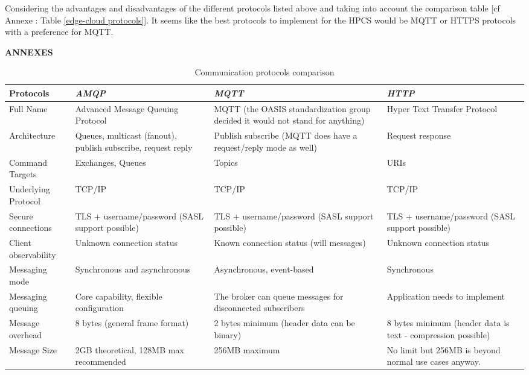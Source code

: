 Considering the advantages and disadvantages of the different protocols listed above and taking into account the comparison table [cf Annexe : Table \ref{edge-cloud protocols}].
It seems like the best protocols to implement for the HPCS would be MQTT or HTTPS protocols with a preference for MQTT.

\newpage
\onecolumn
\centering\textbf{ANNEXES}

\begin{table}[htbp]
    \caption{Communication protocols comparison}
    \begin{center}
    \renewcommand{\arraystretch}{2}
    \begin{tabular}{|p{3cm}|p{4.5cm}|p{4.5cm}|p{4.5cm}|}
    \hline
    \textbf{{Protocols}}& \textbf{\textit{AMQP}}& \textbf{\textit{MQTT}}& \textbf{\textit{HTTP}} \\
    \hline
    Full Name & Advanced Message Queuing Protocol & MQTT (the OASIS standardization group decided it would not stand for anything) & Hyper Text Transfer Protocol\\
    \hline
    Architecture & Queues, multicast (fanout), publish subscribe, request reply & Publish subscribe (MQTT does have a request/reply mode as well) & Request response\\
    \hline
    Command Targets & Exchanges, Queues & Topics & URIs\\
    \hline
    Underlying Protocol & TCP/IP & TCP/IP & TCP/IP\\
    \hline
    Secure connections & TLS + username/password (SASL support possible) & TLS + username/password (SASL support possible) & TLS + username/password (SASL support possible)\\
    \hline
    Client observability & Unknown connection status & Known connection status (will messages) & Unknown connection status\\
    \hline
    Messaging mode & Synchronous and asynchronous & Asynchronous, event-based & Synchronous\\
    \hline
    Messaging queuing & Core capability, flexible configuration & The broker can queue messages for disconnected subscribers & Application needs to implement\\
    \hline
    Message overhead & 8 bytes (general frame format) & 2 bytes minimum (header data can be binary) & 8 bytes minimum (header data is text - compression possible)\\
    \hline
    Message Size & 2GB theoretical, 128MB max recommended & 256MB maximum & No limit but 256MB is beyond normal use cases anyway.\\

\end{tabular}
\end{center}
\end{table}
